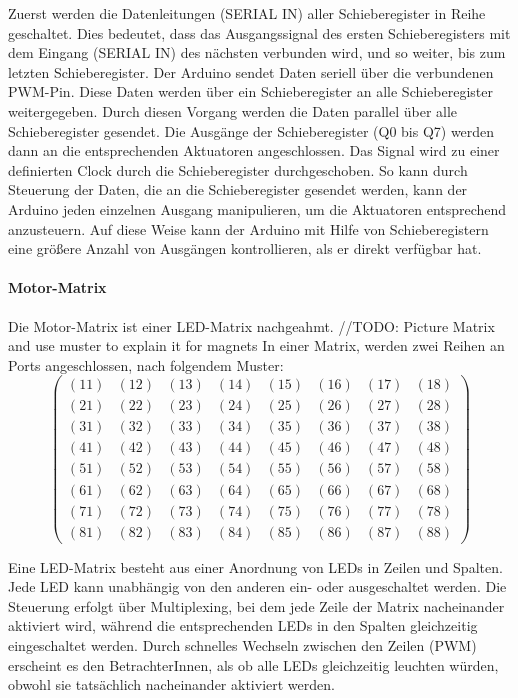Zuerst werden die Datenleitungen (SERIAL IN) aller Schieberegister in Reihe geschaltet. Dies bedeutet, dass das
Ausgangssignal des ersten Schieberegisters mit dem Eingang (SERIAL IN) des nächsten verbunden wird, und so weiter, bis
zum letzten Schieberegister. \newline
Der Arduino sendet Daten seriell über die verbundenen PWM-Pin. Diese Daten werden über ein Schieberegister an
alle Schieberegister weitergegeben. Durch diesen Vorgang werden die Daten parallel über alle Schieberegister gesendet.
\newline
Die Ausgänge der Schieberegister (Q0 bis Q7) werden dann an die entsprechenden Aktuatoren angeschlossen.
Das Signal wird zu einer definierten Clock durch die Schieberegister durchgeschoben. So kann durch Steuerung der Daten,
die an die Schieberegister gesendet werden, kann der Arduino jeden einzelnen Ausgang manipulieren, um die Aktuatoren
entsprechend anzusteuern. \newline
Auf diese Weise kann der Arduino mit Hilfe von Schieberegistern eine größere Anzahl von Ausgängen kontrollieren, als er
direkt verfügbar hat.


\paragraph{Motor-Matrix}
Die Motor-Matrix ist einer LED-Matrix nachgeahmt. //TODO: Picture Matrix and use muster to explain it for magnets
In einer Matrix, werden zwei Reihen an Ports angeschlossen, nach folgendem Muster:
$$
\begin{pmatrix}
	(11) & (12) & (13) & (14) & (15) & (16) & (17) & (18) \\
	(21) & (22) & (23) & (24) & (25) & (26) & (27) & (28) \\
	(31) & (32) & (33) & (34) & (35) & (36) & (37) & (38) \\
	(41) & (42) & (43) & (44) & (45) & (46) & (47) & (48) \\
	(51) & (52) & (53) & (54) & (55) & (56) & (57) & (58) \\
	(61) & (62) & (63) & (64) & (65) & (66) & (67) & (68) \\
	(71) & (72) & (73) & (74) & (75) & (76) & (77) & (78) \\
	(81) & (82) & (83) & (84) & (85) & (86) & (87) & (88)
\end{pmatrix}
$$


Eine LED-Matrix besteht aus einer Anordnung von LEDs in Zeilen und Spalten. Jede LED kann unabhängig von den anderen
ein- oder ausgeschaltet werden. Die Steuerung erfolgt über Multiplexing, bei dem jede Zeile der Matrix nacheinander
aktiviert wird, während die entsprechenden LEDs in den Spalten gleichzeitig eingeschaltet werden. Durch schnelles
Wechseln zwischen den Zeilen (PWM) erscheint es den BetrachterInnen, als ob alle LEDs gleichzeitig leuchten würden,
obwohl sie tatsächlich nacheinander aktiviert werden. \newline

